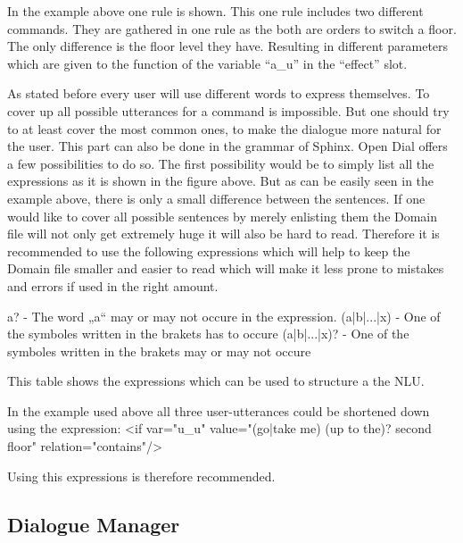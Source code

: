 In the example above one rule is shown.
This one rule includes two different commands.
They are gathered in one rule as the both are orders to switch a floor.
The only difference is the floor level they have.
Resulting in different parameters which are given to the function of the variable “a_u” in the “effect” slot.



As stated before every user will use different words to express themselves.
To cover up all possible utterances for a command is impossible.
But one should try to at least cover the most common ones,  to make the dialogue more natural for the user.
This part can also be done in the  grammar of Sphinx.
Open Dial offers a few possibilities to do so.
The first possibility would be to simply list all the expressions as it is shown in the figure above.
But as can be easily seen in the example above, there is only a small difference between the sentences.
If one would like to cover all possible sentences by merely enlisting them the Domain file will not only get extremely huge it will also be hard to read.
Therefore it is recommended to use the following expressions which will help to keep the Domain file smaller and easier to read which will make it less prone to mistakes and errors if used in the right amount.

a? - The word „a“ may or may not occure in the expression.
(a|b|...|x) - One of the symboles written in the brakets has to occure
(a|b|...|x)? - One of the symboles written in the brakets may or may not occure
 
This table shows the expressions which can be used to structure a the NLU.

In the example used above all three user-utterances could be shortened down using the expression:
<if var="u_u" value="(go|take me) (up to the)?  second floor" relation="contains"/>

Using this expressions is therefore recommended.

\subsection{Dialogue Manager}

